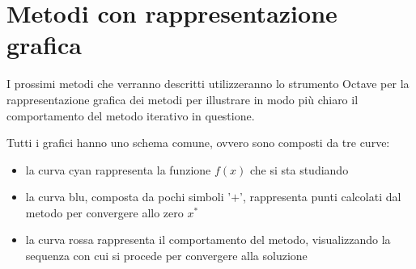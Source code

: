 \section*{Metodi con rappresentazione grafica}
I prossimi metodi che verranno descritti utilizzeranno lo strumento Octave
per la rappresentazione grafica dei metodi per illustrare in modo pi\`u chiaro
il comportamento del metodo iterativo in questione.

Tutti i grafici hanno uno schema comune, ovvero sono composti da tre curve:
\begin{itemize}
  \item la curva cyan rappresenta la funzione $f(x)$ che si sta studiando
  \item la curva blu, composta da pochi simboli '$+$', rappresenta punti
  calcolati dal metodo per convergere allo zero $x^{*}$
  \item la curva rossa rappresenta il comportamento del metodo, visualizzando
  la sequenza con cui si procede per convergere alla soluzione
\end{itemize}


